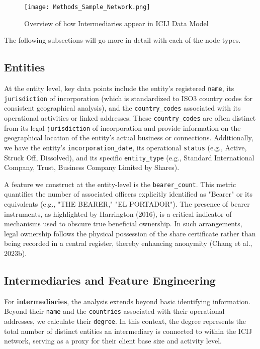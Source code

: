 \begin{figure}[htbp]
    \centering
    \texttt{[image: Methods\_Sample\_Network.png]}
    \caption{Overview of how Intermediaries appear in ICIJ Data Model}
    \label{fig:sample_network}
\end{figure}

The following subsections will go more in detail with each of the node types.

\subsection{Entities}

At the entity level, key data points include the entity's registered \texttt{name}, its \texttt{jurisdiction} of incorporation (which is standardized to ISO3 country codes for consistent geographical analysis), and the \texttt{country\_codes} associated with its operational activities or linked addresses. These \texttt{country\_codes} are often distinct from its legal \texttt{jurisdiction} of incorporation and provide information on the geographical location of the entity's actual business or connections. Additionally, we have the entity's \texttt{incorporation\_date}, its operational \texttt{status} (e.g., Active, Struck Off, Dissolved), and its specific \texttt{entity\_type} (e.g., Standard International Company, Trust, Business Company Limited by Shares).

A feature we construct at the entity-level is the \texttt{bearer\_count}. This metric quantifies the number of associated officers explicitly identified as "Bearer" or its equivalents (e.g., "THE BEARER," "EL PORTADOR"). The presence of bearer instruments, as highlighted by Harrington (2016), is a critical indicator of mechanisms used to obscure true beneficial ownership. In such arrangements, legal ownership follows the physical possession of the share certificate rather than being recorded in a central register, thereby enhancing anonymity (Chang et al., 2023b).

\subsection{Intermediaries and Feature Engineering}

For \textbf{intermediaries}, the analysis extends beyond basic identifying information. Beyond their \texttt{name} and the \texttt{countries} associated with their operational addresses, we calculate their \texttt{degree}. In this context, the degree represents the total number of distinct entities an intermediary is connected to within the ICIJ network, serving as a proxy for their client base size and activity level.

